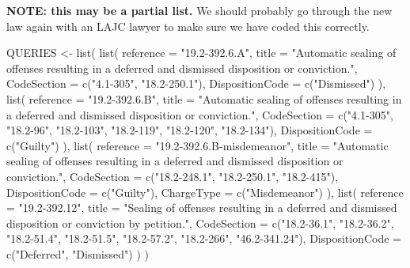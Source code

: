 \documentclass[
]{article}
\newenvironment{Shaded}{\begin{snugshade}}{\end{snugshade}}
\newcommand{\AttributeTok}[1]{\textcolor[rgb]{0.77,0.63,0.00}{#1}}
\newcommand{\FunctionTok}[1]{\textcolor[rgb]{0.00,0.00,0.00}{#1}}
\newcommand{\NormalTok}[1]{#1}
\newcommand{\OtherTok}[1]{\textcolor[rgb]{0.56,0.35,0.01}{#1}}
\newcommand{\StringTok}[1]{\textcolor[rgb]{0.31,0.60,0.02}{#1}}
\begin{document}
\textbf{NOTE: this may be a partial list.} We should probably go through
the new law again with an LAJC lawyer to make sure we have coded this
correctly.

\begin{Shaded}
\begin{Highlighting}[]
\NormalTok{QUERIES }\OtherTok{\textless{}{-}} \FunctionTok{list}\NormalTok{(}
  \FunctionTok{list}\NormalTok{(}
    \AttributeTok{reference =} \StringTok{"19.2{-}392.6.A"}\NormalTok{,}
    \AttributeTok{title =} \StringTok{"Automatic sealing of offenses resulting in a deferred and dismissed disposition or conviction."}\NormalTok{,}
    \AttributeTok{CodeSection =} \FunctionTok{c}\NormalTok{(}\StringTok{"4.1{-}305"}\NormalTok{, }\StringTok{"18.2{-}250.1"}\NormalTok{),}
    \AttributeTok{DispositionCode =} \FunctionTok{c}\NormalTok{(}\StringTok{"Dismissed"}\NormalTok{) }
\NormalTok{  ),}
  \FunctionTok{list}\NormalTok{(}
    \AttributeTok{reference =} \StringTok{"19.2{-}392.6.B"}\NormalTok{,}
    \AttributeTok{title =} \StringTok{"Automatic sealing of offenses resulting in a deferred and dismissed disposition or conviction."}\NormalTok{,}
    \AttributeTok{CodeSection =} \FunctionTok{c}\NormalTok{(}\StringTok{"4.1{-}305"}\NormalTok{, }\StringTok{"18.2{-}96"}\NormalTok{, }\StringTok{"18.2{-}103"}\NormalTok{, }\StringTok{"18.2{-}119"}\NormalTok{, }\StringTok{"18.2{-}120"}\NormalTok{, }\StringTok{"18.2{-}134"}\NormalTok{),}
    \AttributeTok{DispositionCode =} \FunctionTok{c}\NormalTok{(}\StringTok{"Guilty"}\NormalTok{)}
\NormalTok{  ),}
  \FunctionTok{list}\NormalTok{(}
    \AttributeTok{reference =} \StringTok{"19.2{-}392.6.B{-}misdemeanor"}\NormalTok{,}
    \AttributeTok{title =} \StringTok{"Automatic sealing of offenses resulting in a deferred and dismissed disposition or conviction."}\NormalTok{,}
    \AttributeTok{CodeSection =} \FunctionTok{c}\NormalTok{(}\StringTok{"18.2{-}248.1"}\NormalTok{, }\StringTok{"18.2{-}250.1"}\NormalTok{, }\StringTok{"18.2{-}415"}\NormalTok{),}
    \AttributeTok{DispositionCode =} \FunctionTok{c}\NormalTok{(}\StringTok{"Guilty"}\NormalTok{),}
    \AttributeTok{ChargeType =} \FunctionTok{c}\NormalTok{(}\StringTok{"Misdemeanor"}\NormalTok{)}
\NormalTok{  ),}
  \FunctionTok{list}\NormalTok{(}
    \AttributeTok{reference =} \StringTok{"19.2{-}392.12"}\NormalTok{,}
    \AttributeTok{title =} \StringTok{"Sealing of offenses resulting in a deferred and dismissed disposition or conviction by petition."}\NormalTok{,  }
    \AttributeTok{CodeSection =} \FunctionTok{c}\NormalTok{(}\StringTok{"18.2{-}36.1"}\NormalTok{, }\StringTok{"18.2{-}36.2"}\NormalTok{, }\StringTok{"18.2{-}51.4"}\NormalTok{, }\StringTok{"18.2{-}51.5"}\NormalTok{, }\StringTok{"18.2{-}57.2"}\NormalTok{, }\StringTok{"18.2{-}266"}\NormalTok{, }\StringTok{"46.2{-}341.24"}\NormalTok{),}
    \AttributeTok{DispositionCode =} \FunctionTok{c}\NormalTok{(}\StringTok{"Deferred"}\NormalTok{, }\StringTok{"Dismissed"}\NormalTok{)}
\NormalTok{  )}
\NormalTok{)}
\end{Highlighting}
\end{Shaded}
\end{document}
